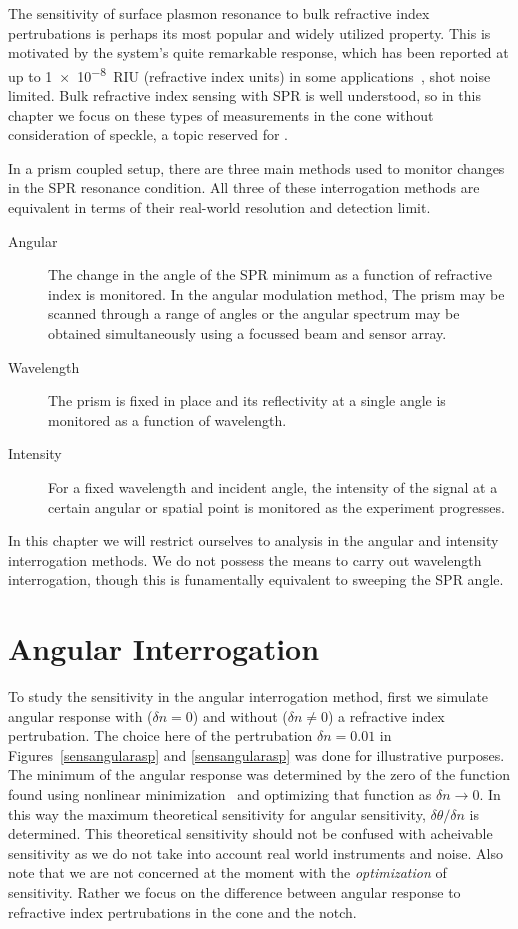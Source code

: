 The sensitivity of surface plasmon resonance to bulk refractive index
pertrubations is perhaps its most popular and widely utilized property.
This is motivated by the system's quite remarkable response, which has been
reported at up to \SI{1e-8}{RIU} (refractive index units) in some
applications~\cite{sprreview}, shot noise limited.  Bulk refractive index
sensing with SPR is well understood, so in this chapter we focus on these
types of measurements in the cone without consideration of speckle, a topic
reserved for .  

In a prism coupled setup, there are three main methods used to
monitor changes in the SPR resonance condition.  All three of these
interrogation methods are equivalent in terms of their real-world
resolution and detection limit.~\cite{pines1952collective}
\begin{description}
	\item [{Angular}] The change in the angle of the SPR minimum as a function
					of refractive index is monitored.  In the angular modulation method,
					The prism may be scanned through a range of angles or the angular
					spectrum may be obtained simultaneously using a focussed beam and
					sensor array.
 \item [{Wavelength}] The prism is fixed in place and its reflectivity at
  a single angle is monitored as a function of wavelength.
	\item [{Intensity}] For a fixed wavelength and incident angle, the
		intensity of the signal at a certain angular or spatial point is
		monitored as the experiment progresses.
\end{description}

In this chapter we will restrict ourselves to analysis in the angular and
intensity interrogation methods.  We do not possess the means to carry out
wavelength interrogation, though this is funamentally equivalent to
sweeping the SPR angle. 

\section{Angular Interrogation}

To study the sensitivity in the angular interrogation method, first we
simulate angular response with ($\delta n = 0$) and without ($\delta n \ne
0$) a refractive index pertrubation.  The choice here of the pertrubation
$\delta n = 0.01$ in Figures~\ref{sensangularasp} and \ref{sensangularasp}
was done for illustrative purposes.  The minimum of the angular response
was determined by the zero of the function found using nonlinear
minimization~\cite{fminbnd} and optimizing that function as $\delta n \to
0$.  In this way the maximum theoretical sensitivity for angular
sensitivity, $\delta \theta/\delta n$ is determined.  This theoretical
sensitivity should not be confused with acheivable sensitivity as we do not
take into account real world instruments and noise.  Also note that we are
not concerned at the moment with the \textit{optimization} of sensitivity.
Rather we focus on the difference between angular response to refractive
index pertrubations in the cone and the notch.  

